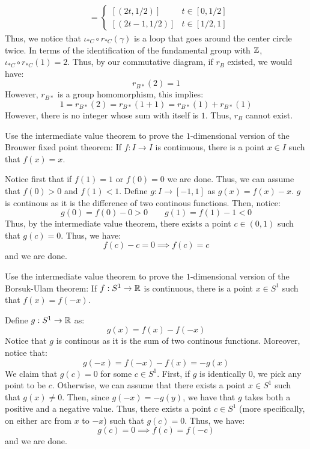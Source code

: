 \documentclass[12pt]{article}
\begin{document}
\begin{solu}
\begin{enumerate}
\begin{align*}
            &= \begin{cases}
                [(2t, 1/2)] & t \in [0, 1/2] \\
                [(2t-1, 1/2)] & t \in [1/2, 1]
            \end{cases}
        \end{align*} 
        Thus, we notice that $\iota_{*C} \circ r_{*C}(\gamma)$ is a loop that goes around the center circle twice. In terms of the identification of the fundamental group with $\mathbb Z$, $\iota_{*C}\circ r_{*C}(1) = 2$. Thus, by our commutative diagram, if $r_B$ existed, we would have:
        \[ r_{B*}(2) = 1\]
        However, $r_{B*}$ is a group homomorphism, this implies: 
        \[ 1 = r_{B*}(2) = r_{B*}(1+1) = r_{B*}(1)+r_{B*}(1) \] 
        However, there is no integer whose sum with itself is $1$. Thus, $r_B$ cannot exist.
    \end{enumerate}
\end{solu}
\newpage

\begin{problab}{4}
    Use the intermediate value theorem to prove the $1$-dimensional version of the Brouwer fixed point theorem: If $f \colon I \to I$ is continuous, there is a point $x \in I$ such that $f(x) = x$. 
\end{problab}
\begin{solu}
    Notice first that if $f(1) = 1$ or $f(0) = 0$ we are done. Thus, we can assume that $f(0) > 0$ and $f(1) < 1$. Define $g: I \to [-1, 1]$ as $g(x) = f(x) - x$. $g$ is continous as it is the difference of two continous functions. Then, notice: 
    \[g(0) = f(0)-0 > 0 \qquad g(1) = f(1) - 1 < 0 \] 
    Thus, by the intermediate value theorem, there exists a point $c \in (0, 1)$ such that $g(c) = 0$. Thus, we have:
    \[f(c) - c = 0 \implies f(c) = c\] 
    and we are done.
\end{solu}
\newpage

\begin{problab}{5}
    Use the intermediate value theorem to prove the $1$-dimensional version of the Borsuk-Ulam theorem: If $f: S^1 \to \mathbb R$ is continuous, there is a point $x \in S^1$ such that $f(x) = f(-x)$.
\end{problab}
\begin{solu}
    Define $g: S^1 \to \mathbb R$ as:
    \[ g(x) = f(x) - f(-x)\]
    Notice that $g$ is continous as it is the sum of two continous functions. Moreover, notice that: 
    \[ g(-x) = f(-x)-f(x) = -g(x)\]
    We claim that $g(c) = 0$ for some $c \in S^1$. First, if $g$ is identically $0$, we pick any point to be $c$. Otherwise, we can assume that there exists a point $x \in S^1$ such that $g(x) \neq 0$. Then, since $g(-x) = -g(y)$, we have that $g$ takes both a positive and a negative value. Thus, there exists a point $c \in S^1$ (more specifically, on either arc from $x$ to $-x$) such that $g(c) = 0$. Thus, we have:
    \[g(c) = 0 \implies f(c) = f(-c)\]
    and we are done. 
\end{solu}
\end{document}
